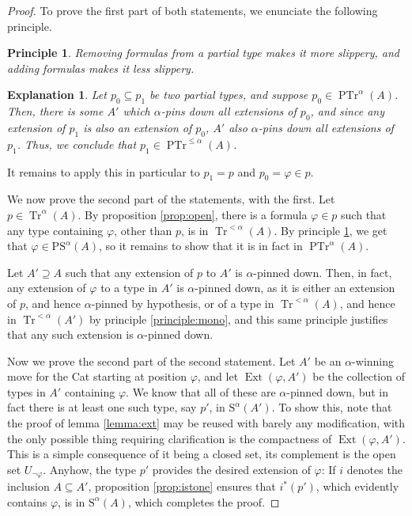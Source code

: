 \documentclass{article}
\newtheorem{principle}{Principle}
\theoremstyle{nonumberplain}
\newtheorem{proof}{Proof}
\newtheorem{explanation}{Explanation}
\newcommand{\Stone}{\mathrm{S}}
\newcommand{\PStone}{\mathrm{PS}}
\DeclareMathOperator{\Tr}{Tr}
\DeclareMathOperator{\PTr}{PTr}
\DeclareMathOperator{\Ext}{Ext}
\begin{document}
\begin{proof}
To prove the first part of both statements, we enunciate the following principle.

\begin{principle}\label{principle:partial}
Removing formulas from a partial type makes it more slippery, and adding formulas makes it less slippery.
\end{principle}

\begin{explanation}
Let $p_0 \subseteq p_1$ be two partial types, and suppose $p_0 \in \PTr^\alpha(A)$. Then, there is some $A'$ which $\alpha$-pins down all extensions of $p_0$, and since any extension of $p_1$ is also an extension of $p_0$, $A'$ also $\alpha$-pins down all extensions of $p_1$. Thus, we conclude that $p_1 \in \PTr^{\leq\alpha}(A)$.
\end{explanation}

It remains to apply this in particular to $p_1 = p$ and $p_0 = \varphi \in p$.

We now prove the second part of the statements, with the first. Let $p \in \Tr^\alpha(A)$. By proposition \ref{prop:open}, there is a formula $\varphi \in p$ such that any type containing $\varphi$, other than $p$, is in $\Tr^{<\alpha}(A)$. By principle \ref{principle:partial}, we get that $\varphi \in \PStone^\alpha(A)$, so it remains to show that it is in fact in $\PTr^\alpha(A)$.

Let $A' \supseteq A$ such that any extension of $p$ to $A'$ is $\alpha$-pinned down. Then, in fact, any extension of $\varphi$ to a type in $A'$ is $\alpha$-pinned down, as it is either an extension of $p$, and hence $\alpha$-pinned by hypothesis, or of a type in $\Tr^{<\alpha}(A)$, and hence in $\Tr^{<\alpha}(A')$ by principle \ref{principle:mono}, and this same principle justifies that any such extension is $\alpha$-pinned down.

Now we prove the second part of the second statement. Let $A'$ be an $\alpha$-winning move for the Cat starting at position $\varphi$, and let $\Ext(\varphi,A')$ be the collection of types in $A'$ containing $\varphi$. We know that all of these are $\alpha$-pinned down, but in fact there is at least one such type, say $p'$, in $\Stone^\alpha(A')$. To show this, note that the proof of lemma \ref{lemma:ext} may be reused with barely any modification, with the only possible thing requiring clarification is the compactness of $\Ext(\varphi,A')$. This is a simple consequence of it being a closed set, its complement is the open set $U_{\neg\varphi}$. Anyhow, the type $p'$ provides the desired extension of $\varphi$: If $i$ denotes the inclusion $A \subseteq A'$, proposition \ref{prop:istone} ensures that $i^*(p')$, which evidently contains $\varphi$, is in $\Stone^\alpha(A)$, which completes the proof.
\end{proof}



\end{document}
